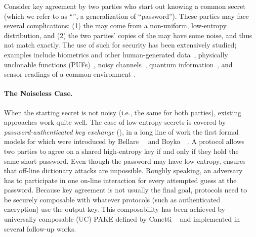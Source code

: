 
Consider key agreement by two parties who start out knowing a common secret (which we refer to as ``\password'', a generalization of ``password'').
These parties may face several complications: 
(1) the \password may come from a non-uniform, low-entropy distribution, and 
(2) the two parties' copies of the \password may have some noise, and thus not match exactly.
The use of such \passwords for security has been extensively studied; examples include biometrics and other human-generated data~\cite{daugman2004,zviran1993comparison,brostoff2000passfaces,ellison2000protecting,mayrhofer2009shake,monrose2002password,ICALP:KolRac08}, physically unclonable functions (PUFs)~\cite{pappu2002physical,CCS:GCVD02,CHES:TSSGVW06,suh2007physical,yu2010secure}, noisy channels~\cite{Wyner75},  quantum information~\cite{bennett1988privacy}, and sensor readings of a common environment \cite{Hanetal17,Hanetal18}.
 
 \paragraph{The Noiseless Case.}
When the starting secret is not noisy (i.e., the same for both parties), existing approaches work quite well. 
The case of low-entropy secrets is covered by \emph{password-authenticated key exchange} (\PAKE), in a long line of work the first formal models for which were introduced by Bellare~\etal~\cite{EC:BelPoiRog00} and Boyko~\etal~\cite{EC:BoyMacPat00}. 
A \PAKE protocol allows two parties to agree on a shared high-entropy key if and only if they hold the same short password. 
Even though the password may have low entropy, \PAKE ensures that off-line dictionary attacks are impossible.
Roughly speaking, an adversary has to participate in one on-line interaction for every attempted guess at the password. 
Because key agreement is not usually the final goal, \PAKE protocols need to be securely composable with whatever protocols (such as authenticated encryption) use the output key. 
This composability has been achieved by universally composable (UC) PAKE defined by Canetti \etal~\cite{EC:CHKLM05} and implemented in several follow-up works.

